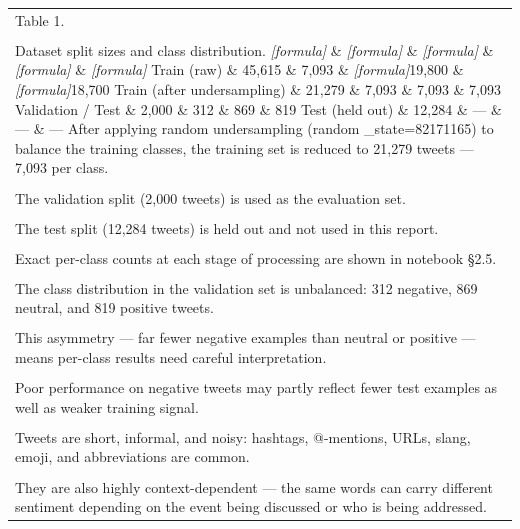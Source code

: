 \documentclass[11pt]{article}
\begin{document}
\begin{longtable}{|p{\dimexpr\linewidth-2\tabcolsep-2\arrayrulewidth\relax}|}
\hline
\rule{0pt}{3.5cm} \\
\hline
Table 1. \\[2pt]
\hline
\rule{0pt}{3.5cm} \\
\hline
Dataset split sizes and class distribution. \textit{[formula]} \& \textit{[formula]} \& \textit{[formula]} \& \textit{[formula]} \& \textit{[formula]} Train (raw) \& 45,615 \& 7,093 \& \textit{[formula]}19,800 \& \textit{[formula]}18,700 Train (after undersampling) \& 21,279 \& 7,093 \& 7,093 \& 7,093 Validation / Test \& 2,000 \& 312 \& 869 \& 819 Test (held out) \& 12,284 \& --- \& --- \& --- After applying random undersampling (random \_state=82171165) to balance the training classes, the training set is reduced to 21,279 tweets --- 7,093 per class. \\[2pt]
\hline
\rule{0pt}{3.5cm} \\
\hline
The validation split (2,000 tweets) is used as the evaluation set. \\[2pt]
\hline
\rule{0pt}{3.5cm} \\
\hline
The test split (12,284 tweets) is held out and not used in this report. \\[2pt]
\hline
\rule{0pt}{3.5cm} \\
\hline
Exact per-class counts at each stage of processing are shown in notebook §2.5. \\[2pt]
\hline
\rule{0pt}{3.5cm} \\
\hline
The class distribution in the validation set is unbalanced: 312 negative, 869 neutral, and 819 positive tweets. \\[2pt]
\hline
\rule{0pt}{3.5cm} \\
\hline
This asymmetry --- far fewer negative examples than neutral or positive --- means per-class results need careful interpretation. \\[2pt]
\hline
\rule{0pt}{3.5cm} \\
\hline
Poor performance on negative tweets may partly reflect fewer test examples as well as weaker training signal. \\[2pt]
\hline
\rule{0pt}{3.5cm} \\
\hline
Tweets are short, informal, and noisy: hashtags, @-mentions, URLs, slang, emoji, and abbreviations are common. \\[2pt]
\hline
\rule{0pt}{3.5cm} \\
\hline
They are also highly context-dependent --- the same words can carry different sentiment depending on the event being discussed or who is being addressed. \\[2pt]

\end{longtable}
\end{document}
